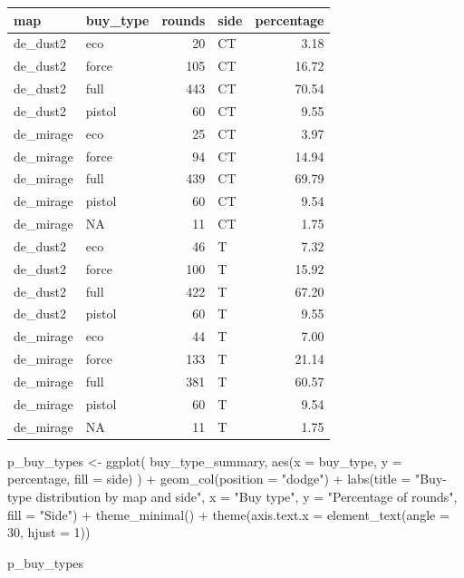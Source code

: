 \documentclass[
  letterpaper,
  DIV=11,
  numbers=noendperiod]{scrartcl}
\newenvironment{Shaded}{\begin{snugshade}}{\end{snugshade}}
\newcommand{\AttributeTok}[1]{\textcolor[rgb]{0.40,0.45,0.13}{#1}}
\newcommand{\DecValTok}[1]{\textcolor[rgb]{0.68,0.00,0.00}{#1}}
\newcommand{\FunctionTok}[1]{\textcolor[rgb]{0.28,0.35,0.67}{#1}}
\newcommand{\NormalTok}[1]{\textcolor[rgb]{0.00,0.23,0.31}{#1}}
\newcommand{\OtherTok}[1]{\textcolor[rgb]{0.00,0.23,0.31}{#1}}
\newcommand{\SpecialCharTok}[1]{\textcolor[rgb]{0.37,0.37,0.37}{#1}}
\newcommand{\StringTok}[1]{\textcolor[rgb]{0.13,0.47,0.30}{#1}}
\newcounter{none} %
\begin{document}
{\def\LTcaptype{none} %
\begin{longtable}[]{@{}llrlr@{}}
\toprule\noalign{}
map & buy\_type & rounds & side & percentage \\
\midrule\noalign{}
\endhead
\bottomrule\noalign{}
\endlastfoot
de\_dust2 & eco & 20 & CT & 3.18 \\
de\_dust2 & force & 105 & CT & 16.72 \\
de\_dust2 & full & 443 & CT & 70.54 \\
de\_dust2 & pistol & 60 & CT & 9.55 \\
de\_mirage & eco & 25 & CT & 3.97 \\
de\_mirage & force & 94 & CT & 14.94 \\
de\_mirage & full & 439 & CT & 69.79 \\
de\_mirage & pistol & 60 & CT & 9.54 \\
de\_mirage & NA & 11 & CT & 1.75 \\
de\_dust2 & eco & 46 & T & 7.32 \\
de\_dust2 & force & 100 & T & 15.92 \\
de\_dust2 & full & 422 & T & 67.20 \\
de\_dust2 & pistol & 60 & T & 9.55 \\
de\_mirage & eco & 44 & T & 7.00 \\
de\_mirage & force & 133 & T & 21.14 \\
de\_mirage & full & 381 & T & 60.57 \\
de\_mirage & pistol & 60 & T & 9.54 \\
de\_mirage & NA & 11 & T & 1.75 \\
\end{longtable}
}

\begin{Shaded}
\begin{Highlighting}[]
\NormalTok{p\_buy\_types }\OtherTok{\textless{}{-}} \FunctionTok{ggplot}\NormalTok{(}
\NormalTok{  buy\_type\_summary, }\FunctionTok{aes}\NormalTok{(}\AttributeTok{x =}\NormalTok{ buy\_type, }\AttributeTok{y =}\NormalTok{ percentage, }\AttributeTok{fill =}\NormalTok{ side)}
\NormalTok{) }\SpecialCharTok{+}
  \FunctionTok{geom\_col}\NormalTok{(}\AttributeTok{position =} \StringTok{"dodge"}\NormalTok{) }\SpecialCharTok{+}
  \FunctionTok{labs}\NormalTok{(}\AttributeTok{title =} \StringTok{"Buy{-}type distribution by map and side"}\NormalTok{,}
       \AttributeTok{x =} \StringTok{"Buy type"}\NormalTok{, }\AttributeTok{y =} \StringTok{"Percentage of rounds"}\NormalTok{, }\AttributeTok{fill =} \StringTok{"Side"}\NormalTok{) }\SpecialCharTok{+}
  \FunctionTok{theme\_minimal}\NormalTok{() }\SpecialCharTok{+}
  \FunctionTok{theme}\NormalTok{(}\AttributeTok{axis.text.x =} \FunctionTok{element\_text}\NormalTok{(}\AttributeTok{angle =} \DecValTok{30}\NormalTok{, }\AttributeTok{hjust =} \DecValTok{1}\NormalTok{))}

\NormalTok{p\_buy\_types}
\end{Highlighting}
\end{Shaded}
\end{document}
